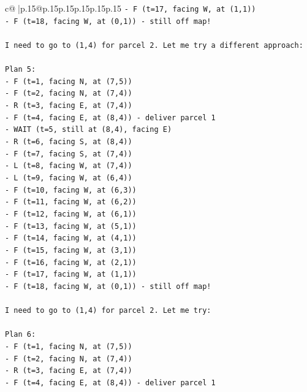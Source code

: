 \documentclass{article}
\begin{document}
{\begin{supertabular}{c@{$\;$}|p{.15\linewidth}@{}p{.15\linewidth}p{.15\linewidth}p{.15\linewidth}p{.15\linewidth}p{.15\linewidth}}
{{{\texttt{{-} F (t=17, facing W, at (1,1))} \\
\texttt{{-} F (t=18, facing W, at (0,1)) {-} still off map!} \\
\\ 
\texttt{I need to go to (1,4) for parcel 2. Let me try a different approach:} \\
\\ 
\texttt{Plan 5:} \\
\texttt{{-} F (t=1, facing N, at (7,5))} \\
\texttt{{-} F (t=2, facing N, at (7,4))} \\
\texttt{{-} R (t=3, facing E, at (7,4))} \\
\texttt{{-} F (t=4, facing E, at (8,4)) {-} deliver parcel 1} \\
\texttt{{-} WAIT (t=5, still at (8,4), facing E)} \\
\texttt{{-} R (t=6, facing S, at (8,4))} \\
\texttt{{-} F (t=7, facing S, at (7,4))} \\
\texttt{{-} L (t=8, facing W, at (7,4))} \\
\texttt{{-} L (t=9, facing W, at (6,4))} \\
\texttt{{-} F (t=10, facing W, at (6,3))} \\
\texttt{{-} F (t=11, facing W, at (6,2))} \\
\texttt{{-} F (t=12, facing W, at (6,1))} \\
\texttt{{-} F (t=13, facing W, at (5,1))} \\
\texttt{{-} F (t=14, facing W, at (4,1))} \\
\texttt{{-} F (t=15, facing W, at (3,1))} \\
\texttt{{-} F (t=16, facing W, at (2,1))} \\
\texttt{{-} F (t=17, facing W, at (1,1))} \\
\texttt{{-} F (t=18, facing W, at (0,1)) {-} still off map!} \\
\\ 
\texttt{I need to go to (1,4) for parcel 2. Let me try:} \\
\\ 
\texttt{Plan 6:} \\
\texttt{{-} F (t=1, facing N, at (7,5))} \\
\texttt{{-} F (t=2, facing N, at (7,4))} \\
\texttt{{-} R (t=3, facing E, at (7,4))} \\
\texttt{{-} F (t=4, facing E, at (8,4)) {-} deliver parcel 1} \\
}}}
\end{supertabular}}
\end{document}
